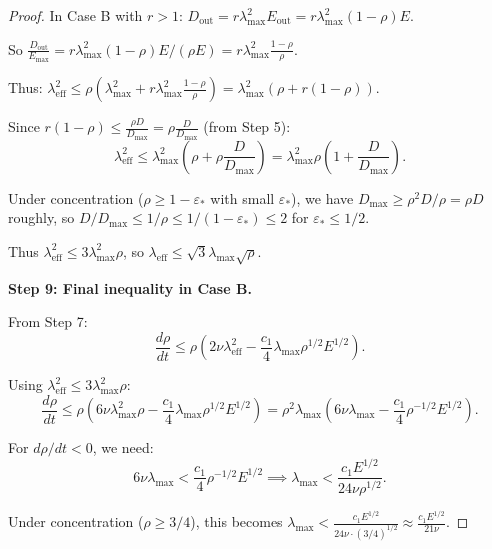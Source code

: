 \documentclass[11pt]{article}
\theoremstyle{definition}
\begin{document}
\begin{proof}
In Case B with $r > 1$: $D_{\text{out}} = r \lambda_{\max}^2 E_{\text{out}} = r \lambda_{\max}^2 (1-\rho) E$.

So $\frac{D_{\text{out}}}{E_{\max}} = r \lambda_{\max}^2 (1-\rho) E / (\rho E) = r \lambda_{\max}^2 \frac{1-\rho}{\rho}$.

Thus: $\lambda_{\text{eff}}^2 \leq \rho \left( \lambda_{\max}^2 + r \lambda_{\max}^2 \frac{1-\rho}{\rho} \right) = \lambda_{\max}^2 \left( \rho + r(1-\rho) \right)$.

Since $r(1-\rho) \leq \frac{\rho D}{D_{\max}} = \rho \frac{D}{D_{\max}}$ (from Step 5):
\begin{equation}
\lambda_{\text{eff}}^2 \leq \lambda_{\max}^2 \left( \rho + \rho \frac{D}{D_{\max}} \right) = \lambda_{\max}^2 \rho \left(1 + \frac{D}{D_{\max}}\right).
\end{equation}

Under concentration ($\rho \geq 1 - \varepsilon_*$ with small $\varepsilon_*$), we have $D_{\max} \geq \rho^2 D / \rho = \rho D$ roughly, so $D/D_{\max} \leq 1/\rho \leq 1/(1-\varepsilon_*) \leq 2$ for $\varepsilon_* \leq 1/2$.

Thus $\lambda_{\text{eff}}^2 \leq 3 \lambda_{\max}^2 \rho$, so $\lambda_{\text{eff}} \leq \sqrt{3} \lambda_{\max} \sqrt{\rho}$.

\textbf{Step 9: Final inequality in Case B.}

From Step 7:
\begin{equation}
\frac{d\rho}{dt} \leq \rho \left( 2\nu \lambda_{\text{eff}}^2 - \frac{c_1}{4} \lambda_{\max} \rho^{1/2} E^{1/2} \right).
\end{equation}

Using $\lambda_{\text{eff}}^2 \leq 3 \lambda_{\max}^2 \rho$:
\begin{equation}
\frac{d\rho}{dt} \leq \rho \left( 6\nu \lambda_{\max}^2 \rho - \frac{c_1}{4} \lambda_{\max} \rho^{1/2} E^{1/2} \right) = \rho^2 \lambda_{\max} \left( 6\nu \lambda_{\max} - \frac{c_1}{4} \rho^{-1/2} E^{1/2} \right).
\end{equation}

For $d\rho/dt < 0$, we need:
\begin{equation}
6\nu \lambda_{\max} < \frac{c_1}{4} \rho^{-1/2} E^{1/2} \implies \lambda_{\max} < \frac{c_1 E^{1/2}}{24 \nu \rho^{1/2}}.
\end{equation}

Under concentration ($\rho \geq 3/4$), this becomes $\lambda_{\max} < \frac{c_1 E^{1/2}}{24\nu \cdot (3/4)^{1/2}} \approx \frac{c_1 E^{1/2}}{21\nu}$.


\end{proof}
\end{document}
